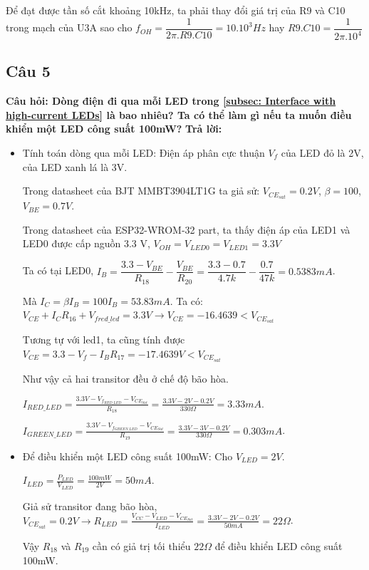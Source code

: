 Để đạt được tần số cắt khoảng 10kHz, ta phải thay đổi giá trị của R9 và C10 trong mạch của U3A sao cho $ f_{OH} = \dfrac{1}{2\pi.R9.C10} = 10.10^3 Hz$ hay $ R9.C10 = \dfrac{1}{2\pi.10^4}$
\pagebreak
\subsection{Câu 5}
 \textbf{Câu hỏi: Dòng điện đi qua mỗi LED trong \ref{subsec: Interface with high-current LEDs} là bao nhiêu? Ta có thể làm gì nếu ta muốn điều khiển một LED công suất 100mW?}
\textbf{Trả lời:}
\begin{itemize}
    \item Tính toán dòng qua mỗi LED:
     Điện áp phân cực thuận $V_f$ của LED đỏ là 2V, của LED xanh lá là 3V.

    Trong datasheet của BJT MMBT3904LT1G ta giả sử: $V_{CE_{sat}} = 0.2V$, $\beta = 100$, $V_{BE} = 0.7 V$.
    
    Trong datasheet của ESP32-WROM-32 part, ta thấy điện áp của LED1 và LED0 được cấp nguồn 3.3 V, $V_{OH} = V_{LED0} = V_{LED1} = 3.3V$
    
    Ta có tại LED0, $I_B = \dfrac{3.3 - V_{BE}}{R_{18}} - \dfrac{V_{BE}}{R_{20}} = \dfrac{3.3 - 0.7}{4.7k} - \dfrac{0.7}{47k} = 0.5383 mA$.

    Mà $I_C = \beta I_B = 100 I_B = 53.83 mA$. Ta có: $V_{CE} + I_CR_{16} + V_{f{red\_led}} = 3.3 V \rightarrow V_{CE} = -16.4639 < V_{CE_{sat}}$

    Tương tự với led1, ta cũng tính được $V_{CE} = 3.3 - V_{f} - I_BR_{17} = -17.4639 V < V_{CE_{sat}}$

    Như vậy cả hai transitor đều ở chế độ bão hòa.

     $I_{RED\_LED} = \frac{3.3V - V_{f_{RED\_LED}} - V_{CE_{Sat}}}{R_{18}} = \frac{3.3V - 2V - 0.2V}{330\Omega} = 3.33mA$.
     
     $I_{GREEN\_LED} = \frac{3.3V - V_{f_{GREEN\_LED}} - V_{CE_{Sat}}}{R_{19}} = \frac{3.3V - 3V - 0.2V}{330\Omega} = 0.303mA$.
    \item Để điều khiển một LED công suất 100mW:
        Cho $V_{LED} = 2V$.

        $I_{LED} = \frac{P_{LED}}{V_{LED}} = \frac{100mW}{2V} = 50mA$.

Giả sử transitor đang bão hòa, $V_{CE_{sat}} = 0.2 V \rightarrow R_{LED} = \frac{V_{CC} - V_{LED} - V_{CE_{Sat}}}{I_{LED}} = \frac{3.3V - 2V - 0.2V}{50mA} = 22\Omega$.
        
        Vậy $R_{18}$ và $R_{19}$ cần có giả trị tối thiểu $22\Omega$ để điều khiển LED công suất 100mW.
\end{itemize}

